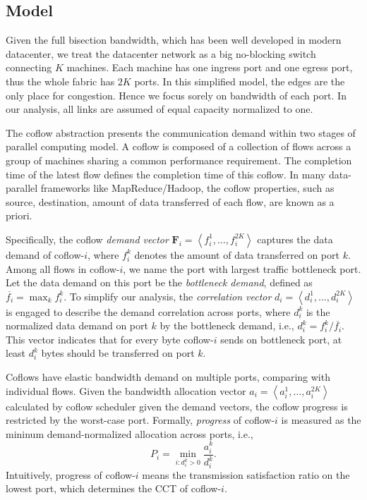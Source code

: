 \documentclass[10pt, conference, letterpaper]{IEEEtran}
\begin{document}
\subsection{Model}
Given the full bisection bandwidth, which has been well developed in modern datacenter\cite{jupiter}, we treat the datacenter network as a big no-blocking switch connecting $K$ machines. Each machine has one ingress port and one egress port, thus the whole fabric has $2K$ ports. In this simplified model, the edges are the only place for congestion. Hence we focus sorely on bandwidth of each port. In our analysis, all links are assumed of equal capacity normalized to one.

The coflow abstraction presents the communication demand within two stages of parallel computing model. A coflow is composed of a collection of flows across a group of machines sharing a common performance requirement. The completion time of the latest flow defines the completion time of this coflow. In many data-parallel frameworks like MapReduce/Hadoop, the coflow properties, such as source, destination, amount of data transferred of each flow, are known as a priori\cite{varys, aalo, bingchuan}.

Specifically, the coflow \emph{demand vector} $\mathbf{F}_i = \left\langle f_i^1,\dots,f_i^{2K}\right\rangle$ captures the data demand of coflow-$i$, where $f_i^k$ denotes the amount of data transferred on port $k$. Among all flows in coflow-$i$, we name the port with largest traffic bottleneck port. Let the data demand on this port be the \emph{bottleneck demand}, defined as $\overline{f_i}=\max_{k} f_i^k$. To simplify our analysis, the \emph{correlation vector} $d_i = \left\langle d_i^1,\dots,d_i^{2K}\right\rangle$ is engaged to describe the demand correlation across ports, where $d_i^k$ is the normalized data demand on port $k$ by the bottleneck demand, i.e., $d_i^k = f_i^k/\overline{f_i}$. This vector indicates that for every byte coflow-$i$ sends on bottleneck port, at least $d_i^k$ bytes should be transferred on port $k$.
 
Coflows have elastic bandwidth demand on multiple ports, comparing with individual flows. Given the bandwidth allocation vector $a_i=\left\langle a_i^1,\dots,a_i^{2K}\right\rangle$ calculated by coflow scheduler given the demand vectors, the coflow progress is restricted by the worst-case port. Formally, \emph{progress} of coflow-$i$ is measured as the mininum demand-normalized allocation across ports, i.e.,
 \begin{equation}
 	P_i = \min\limits_{i:d_i^k>0}\frac{a_i^k}{d_i^k}.
 \end{equation}
 Intuitively, progress of coflow-$i$ means the transmission satisfaction ratio on the lowest port, which determines the CCT of coflow-$i$.
 
\end{document}
